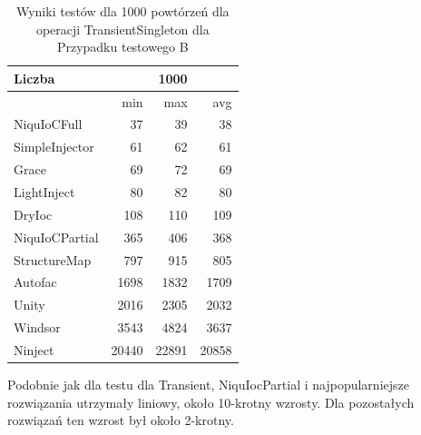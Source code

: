\documentclass[12pt]{article}
\begin{document}
\begin{table}[H]
\captionsetup{belowskip=0pt,aboveskip=0pt}
\begin{center}
\begin{small}
	\begin{tabular}{ | l | r r r | }
    		\hline
Liczba & & 1000 & \\ \hline
 & min & max & avg \\ \hline
NiquIoCFull & 37 & 39 & 38 \\ \hline
SimpleInjector & 61 & 62 & 61 \\ \hline
Grace & 69 & 72 & 69 \\ \hline
LightInject & 80 & 82 & 80 \\ \hline
DryIoc & 108 & 110 & 109 \\ \hline
NiquIoCPartial & 365 & 406 & 368 \\ \hline
StructureMap & 797 & 915 & 805 \\ \hline
Autofac & 1698 & 1832 & 1709 \\ \hline
Unity & 2016 & 2305 & 2032 \\ \hline
Windsor & 3543 & 4824 & 3637 \\ \hline
Ninject & 20440 & 22891 & 20858 \\ \hline
  	\end{tabular}
\end{small}
\end{center}
\caption{Wyniki testów dla 1000 powtórzeń dla operacji TransientSingleton dla Przypadku testowego B}
\label{TestCaseB_TransientSingleton1000}
\end{table}
Podobnie jak dla testu dla Transient, NiquIocPartial i najpopularniejsze rozwiązania utrzymały liniowy, około 10-krotny wzrosty. Dla pozostałych rozwiązań ten wzrost był około 2-krotny.
\end{document}
